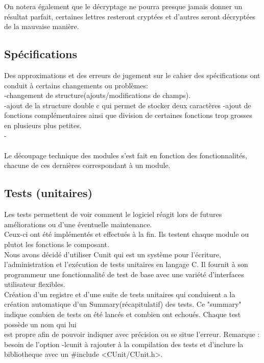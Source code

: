 \documentclass[a4]{article}
\begin{document}
    On notera également que le décryptage ne pourra presque jamais donner un résultat parfait, certaines lettres resteront 
    cryptées et d'autres seront décryptées de la mauvaise manière. 
		
		\subsection{Spécifications}
		Des approximations et des erreurs de jugement sur le cahier des spécifications ont conduit à certains changements ou problèmes:\\
		-changement de structure(ajouts/modifications de champs). \\
		-ajout de la structure double c qui permet de stocker deux caractères
		-ajout de fonctions complémentaires ainsi que division de certaines fonctions trop grosses en plusieurs plus petites.\\
		
    -\\ \\
		
	Le découpage technique des modules s'est fait en fonction des fonctionnalités, chacune de ces dernières correspondant 
    à un module.
		
		\subsection{Tests (unitaires)}
Les tests permettent de voir comment le logiciel réagit lors de futures améliorations ou d'une éventuelle maintenance. \\ 
Ceux-ci ont été implémentés et effectués à la fin. Ils testent chaque module ou plutot les fonctions le composant. \\
Nous avons décidé d'utiliser Cunit qui est un système pour l'écriture, l'administration et l'exécution de tests unitaires
en langage C. Il fournit à son programmeur une fonctionnalité de test de base avec une variété d'interfaces utilisateur flexibles.\\
Création d'un registre et d'une suite de tests unitaires qui conduisent a la création automatique d'un Summary(récapitulatif)
des tests. Ce "summary" indique combien de tests on été lancés et combien ont echoués. Chaque test possède un nom qui lui\\
est propre afin de pouvoir indiquer avec précision ou se situe l'erreur.
Remarque : besoin de l'option -lcunit à rajouter à la compilation des tests et d'inclure la bibliotheque avec un
\#include <CUnit/CUnit.h>.\\ \\ \\ 
\end{document}
